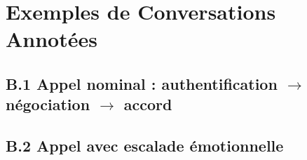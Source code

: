 \chapter{Exemples de Conversations Annotées}

\section*{B.1 Appel nominal : authentification $\rightarrow$ négociation $\rightarrow$ accord}


\section*{B.2 Appel avec escalade émotionnelle}

